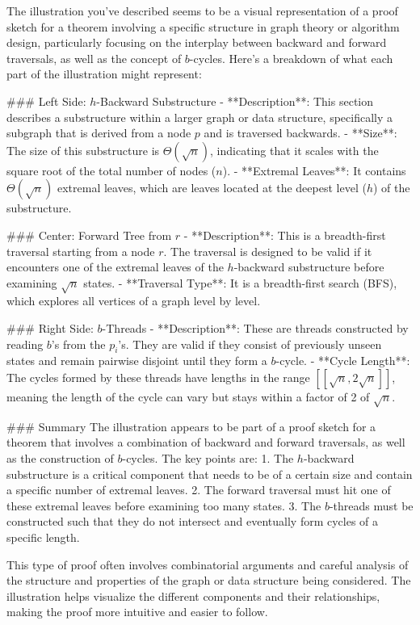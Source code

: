 The illustration you've described seems to be a visual representation of a proof sketch for a theorem involving a specific structure in graph theory or algorithm design, particularly focusing on the interplay between backward and forward traversals, as well as the concept of $b$-cycles. Here's a breakdown of what each part of the illustration might represent:

### Left Side: $h$-Backward Substructure
- **Description**: This section describes a substructure within a larger graph or data structure, specifically a subgraph that is derived from a node $p$ and is traversed backwards.
- **Size**: The size of this substructure is $\Theta(\sqrt{n})$, indicating that it scales with the square root of the total number of nodes ($n$).
- **Extremal Leaves**: It contains $\Theta(\sqrt{n})$ extremal leaves, which are leaves located at the deepest level ($h$) of the substructure.

### Center: Forward Tree from $r$
- **Description**: This is a breadth-first traversal starting from a node $r$. The traversal is designed to be valid if it encounters one of the extremal leaves of the $h$-backward substructure before examining $\sqrt{n}$ states.
- **Traversal Type**: It is a breadth-first search (BFS), which explores all vertices of a graph level by level.

### Right Side: $b$-Threads
- **Description**: These are threads constructed by reading $b$'s from the $p_i$'s. They are valid if they consist of previously unseen states and remain pairwise disjoint until they form a $b$-cycle.
- **Cycle Length**: The cycles formed by these threads have lengths in the range $[\![\sqrt{n}, 2\sqrt{n}]\!]$, meaning the length of the cycle can vary but stays within a factor of 2 of $\sqrt{n}$.

### Summary
The illustration appears to be part of a proof sketch for a theorem that involves a combination of backward and forward traversals, as well as the construction of $b$-cycles. The key points are:
1. The $h$-backward substructure is a critical component that needs to be of a certain size and contain a specific number of extremal leaves.
2. The forward traversal must hit one of these extremal leaves before examining too many states.
3. The $b$-threads must be constructed such that they do not intersect and eventually form cycles of a specific length.

This type of proof often involves combinatorial arguments and careful analysis of the structure and properties of the graph or data structure being considered. The illustration helps visualize the different components and their relationships, making the proof more intuitive and easier to follow.